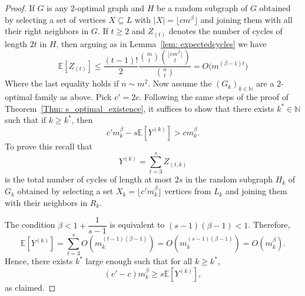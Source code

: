 \documentclass[10pt,a4paper]{amsart}
\newcommand{\EE}{\ensuremath{\mathbb{E}}}
\newcommand{\NN}{\ensuremath{\mathbb{N}}}
\renewcommand{\geq}{\geqslant}
\renewcommand{\leq}{\leqslant}
\begin{document}
\begin{proof} If $G$ is any $2$-optimal graph and $H$ be a random subgraph of $G$ obtained by selecting a set of vertices
$X \subseteq L$ with $|X| = \lfloor c m^{\beta} \rfloor$ and joining them with all their right neighbors in $G$.
If $t \geq 2$ and $Z_{(t)}$ denotes the number of cycles of length $2t$ in $H$, then arguing as in Lemma~\ref{lem: expectedcycles} we have
\[
\EE[Z_{(t)}] \leq \frac{(t-1)!}{2}
\frac{\binom{m}{t}\binom{\lfloor c m^{\beta} \rfloor}{t}}{\binom{n}{t}}= O\bigl(m^{(\beta-1)t}\bigr)
\]
Where the last equality holds if $n \sim m^2$.
Now assume the $(G_k)_{k\in \NN}$ are a $2$-optimal family as above. Pick $c' = 2c$. Following the same steps of the proof of Theorem~\ref{Thm: s_optimal_existence}, it suffices to show that there exists
$k^{*} \in \NN$ such that if $k \geq k^{*}$, then
\[
c' m_k^{\beta} - s \EE[Y^{(k)}] > c m_k^{\beta}.
\]
To prove this recall that
\[
Y^{(k)} = \sum_{t=3}^{s} Z_{(t,k)}
\]
is the total number of cycles of length at most $2s$ in the random subgraph $H_k$ of $G_k$ obtained by selecting
a set $X_k = \lfloor c' m_k^{\beta} \rfloor$ vertices from $L_k$ and joining them with their neighbors in $R_k$. 

The condition $\beta < 1 + \dfrac{1}{s-1}$ is equivalent to $(s-1)(\beta - 1) < 1$.
Therefore,
\[
\EE[Y^{(k)}]
= \sum_{t = 3}^{s} O\!\left(m_k^{(t-1)(\beta-1)}\right)
= O\!\left(m_k^{(s-1)(\beta-1)}\right)
= O\!\left(m_k^{\beta}\right).
\]
Hence, there exists $k^{*}$ large enough such that for all $k \geq k^{*}$,
\[
(c' - c)m_k^{\beta} \geq s \EE[Y^{(k)}],
\]
as claimed.\end{proof}
\end{document}
